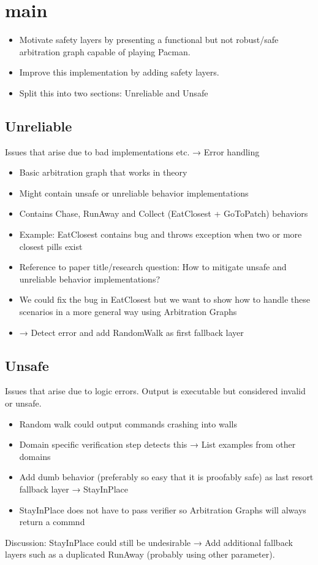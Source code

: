 \section{main}

\begin{itemize}
    \item Motivate safety layers by presenting a functional but not robust/safe arbitration graph capable of playing Pacman.
    \item Improve this implementation by adding safety layers.
    \item Split this into two sections: Unreliable and Unsafe
\end{itemize}

\subsection{Unreliable}
Issues that arise due to bad implementations etc. → Error handling
\begin{itemize}
    \item Basic arbitration graph that works in theory
    \item Might contain unsafe or unreliable behavior implementations
    \item Contains Chase, RunAway and Collect (EatClosest + GoToPatch) behaviors
    \item Example: EatClosest contains bug and throws exception when two or more closest pills exist
    \item Reference to paper title/research question: How to mitigate unsafe and unreliable behavior implementations?
    \item We could fix the bug in EatClosest but we want to show how to handle these scenarios in a more general way using Arbitration Graphs
    \item → Detect error and add RandomWalk as first fallback layer
\end{itemize}

\subsection{Unsafe}
Issues that arise due to logic errors. Output is executable but considered invalid or unsafe.
\begin{itemize}
    \item Random walk could output commands crashing into walls
    \item Domain specific verification step detects this → List examples from other domains
    \item Add dumb behavior (preferably so easy that it is proofably safe) as last resort fallback layer → StayInPlace
    \item StayInPlace does not have to pass verifier so Arbitration Graphs will always return a commnd
\end{itemize}
Discussion: StayInPlace could still be undesirable → Add additional fallback layers such as a duplicated RunAway (probably using other parameter).
